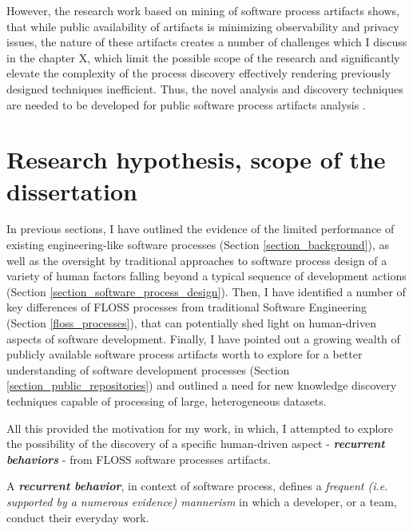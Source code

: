 However, the research work based on mining of software process artifacts shows, that while public availability 
of artifacts is minimizing observability and privacy issues, the nature of these artifacts creates a number of 
challenges which I discuss in the chapter X, which limit the possible scope of the research and significantly 
elevate the complexity of the process discovery effectively rendering previously designed techniques inefficient.
Thus, the novel analysis and discovery techniques are needed to be developed for public software process artifacts 
analysis \cite{citeulike:7853299}.

%
%
\section{Research hypothesis, scope of the dissertation}\label{section_research_hypothesis}
In previous sections, I have outlined the evidence of the limited performance of existing engineering-like 
software processes (Section \ref{section_background}),
as well as the oversight by traditional approaches to software process design 
of a variety of human factors falling beyond a typical sequence of development actions  
(Section \ref{section_software_process_design}).
Then, I have identified a number of key differences of FLOSS processes from traditional Software Engineering 
(Section \ref{floss_processes}), that can potentially shed light on human-driven aspects of software development.
Finally, I have pointed out a growing wealth of publicly available software process artifacts worth to explore 
for a better understanding of software development processes (Section \ref{section_public_repositories}) and 
outlined a need for new knowledge discovery techniques capable of processing of large, heterogeneous datasets.

All this provided the motivation for my work, in which, I attempted to explore the possibility of the discovery 
of a specific human-driven aspect - \textit{\textbf{recurrent behaviors}} - from FLOSS software processes artifacts.
\begin{defn}\label{def_process}
A \textbf{\textit{recurrent behavior}}, in context of software process, defines a \textit{frequent 
(i.e. supported by a numerous evidence) mannerism} in which a developer, or a team, conduct their everyday work.
\end{defn}

